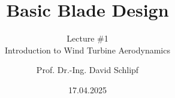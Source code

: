 \documentclass[aspectratio=1610,handout]{beamer}
\title[\#1: Basic Blade Design]{Basic Blade Design}
\institute[WETI]{Wind Energy Technology Institute}
\author[David Schlipf]{Prof. Dr.-Ing. David Schlipf}
\date{17.04.2025}
\subtitle{Lecture \#1\\Introduction to Wind Turbine Aerodynamics}
\begin{document}
\maketitle




%
\finalpage
\end{document}
